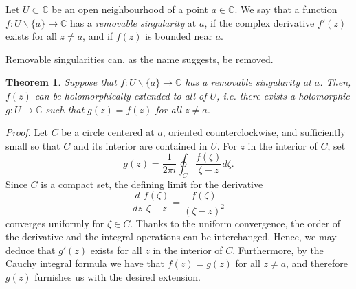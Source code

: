 \documentclass[12pt]{article}
\newcommand{\cnums}{\mathbb{C}}
\newtheorem{theorem}[proposition]{Theorem}
\begin{document}
Let $U\subset\cnums$ be an open neighbourhood of a
point $a\in \cnums$.  We say that a function
$f:U\backslash\{a\}\rightarrow \cnums$ has a \emph{removable singularity} at
$a$, if the complex derivative $f'(z)$ exists for all $z\neq a$, and
if $f(z)$ is  bounded near $a$.

Removable singularities can, as the name suggests, be removed.
\begin{theorem}
  Suppose that $f:U\backslash\{a\}\rightarrow \cnums$ has a removable
  singularity at $a$.  Then, $f(z)$ can be holomorphically extended to
  all of $U$, i.e.
  there exists a holomorphic $g:U\rightarrow\cnums$ such that
  $g(z)=f(z)$ for all $z\neq a$.
\end{theorem}

\emph{Proof.}
Let $C$ be a circle centered at $a$, oriented counterclockwise, and
sufficiently small so that $C$ and its interior are contained in
$U$. For  $z$ in the interior of $C$, set
$$g(z) = \frac{1}{2\pi i} \oint_C \frac{f(\zeta)}{\zeta-z}d\zeta.$$
Since $C$ is a compact set, the defining limit for the derivative
$$\frac{d}{dz} \frac{f(\zeta)}{\zeta-z}= 
\frac{f(\zeta)}{(\zeta-z)^2}$$
converges uniformly for $\zeta\in C$.  Thanks to the uniform
convergence, the order of the derivative and the integral operations
can be interchanged.  Hence, we may deduce that $g'(z)$ exists 
for all $z$ in the interior of $C$.  Furthermore, by the Cauchy
integral formula we have that $f(z)=g(z)$ for all $z\neq a$, and therefore
$g(z)$ furnishes us with the desired extension.
\end{document}
